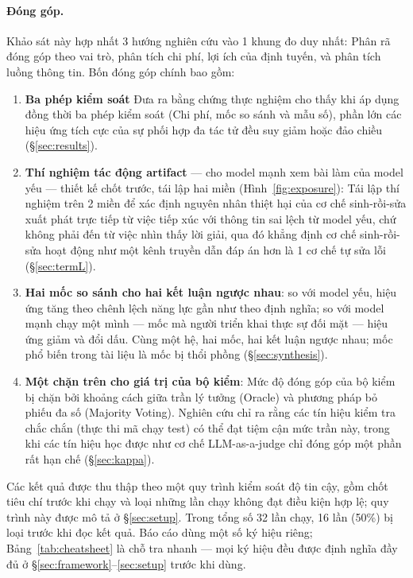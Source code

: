 \documentclass[11pt,a4paper]{article}
\begin{document}
\paragraph{Đóng góp.} Khảo sát này hợp nhất 3 hướng nghiên cứu vào 1 khung đo duy nhất: Phân rã đóng góp theo vai trò, phân tích chi phí, lợi ích của định tuyến, và phân tích luồng thông tin. Bốn đóng góp chính bao gồm:
\begin{enumerate}\itemsep2pt
  \item \textbf{Ba phép kiểm soát} Đưa ra bằng chứng thực nghiệm cho thấy khi áp dụng đồng thời ba phép kiểm soát (Chi phí, mốc so sánh và mẫu số), phần lớn các hiệu ứng tích cực của sự phối hợp đa tác tử đều suy giảm hoặc đảo chiều (\S\ref{sec:results}).
  \item \textbf{Thí nghiệm tác động artifact} --- cho model mạnh xem bài làm của model yếu ---
        thiết kế chốt trước, tái lập hai miền (Hình~\ref{fig:exposure}): Tái lập thí nghiệm trên 2 miền để xác định nguyên nhân thiệt hại của cơ chế sinh-rồi-sửa xuất phát trực tiếp từ việc tiếp xúc với thông tin sai lệch từ model yếu, chứ không phải đến từ việc nhìn thấy lời giải, qua đó khẳng định cơ chế sinh-rồi-sửa hoạt động như một kênh truyền dẫn đáp án hơn là 1 cơ chế tự sửa lỗi (\S\ref{sec:termL}).
  \item \textbf{Hai mốc so sánh cho hai kết luận ngược nhau}: so với model yếu, hiệu ứng tăng theo chênh lệch năng lực gần như theo định nghĩa; so với model mạnh chạy một mình --- mốc mà người triển khai thực sự đối mặt --- hiệu ứng giảm và đổi dấu. Cùng một hệ, hai mốc, hai kết luận ngược nhau; mốc phổ biến trong tài liệu là mốc bị thổi phồng (\S\ref{sec:synthesis}).
  \item \textbf{Một chặn trên cho giá trị của bộ kiểm}: Mức độ đóng góp của bộ kiểm bị chặn bởi khoảng cách giữa trần lý tưởng (Oracle) và phương pháp bỏ phiếu đa số (Majority Voting). Nghiên cứu chỉ ra rằng các tín hiệu kiểm tra chắc chắn (thực thi mã chạy test) có thể đạt tiệm cận mức trần này, trong khi các tín hiệu học được như cơ chế LLM-as-a-judge chỉ đóng góp một phần rất hạn chế (\S\ref{sec:kappa}).
\end{enumerate}
Các kết quả được thu thập theo một quy trình kiểm soát độ tin cậy, gồm chốt tiêu chí trước khi
chạy và loại những lần chạy không đạt điều kiện hợp lệ; quy trình này được mô tả ở
\S\ref{sec:setup}. Trong tổng số 32 lần chạy, 16 lần (50\%) bị loại trước khi đọc kết quả. Báo cáo dùng một số ký hiệu riêng; Bảng~\ref{tab:cheatsheet} là chỗ tra nhanh ---
mọi ký hiệu đều được định nghĩa đầy đủ ở \S\ref{sec:framework}--\ref{sec:setup} trước khi
dùng.
\end{document}
